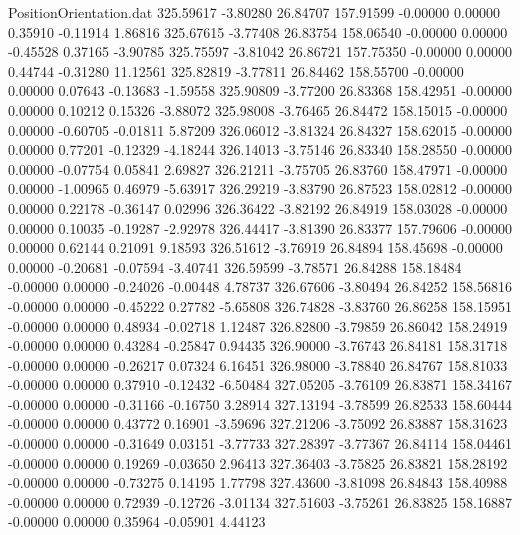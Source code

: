\begin{filecontents}{PositionOrientation.dat}
 325.59617   -3.80280   26.84707   157.91599   -0.00000    0.00000    0.35910   -0.11914    1.86816
 325.67615   -3.77408   26.83754   158.06540   -0.00000    0.00000   -0.45528    0.37165   -3.90785
 325.75597   -3.81042   26.86721   157.75350   -0.00000    0.00000    0.44744   -0.31280   11.12561
 325.82819   -3.77811   26.84462   158.55700   -0.00000    0.00000    0.07643   -0.13683   -1.59558
 325.90809   -3.77200   26.83368   158.42951   -0.00000    0.00000    0.10212    0.15326   -3.88072
 325.98008   -3.76465   26.84472   158.15015   -0.00000    0.00000   -0.60705   -0.01811    5.87209
 326.06012   -3.81324   26.84327   158.62015   -0.00000    0.00000    0.77201   -0.12329   -4.18244
 326.14013   -3.75146   26.83340   158.28550   -0.00000    0.00000   -0.07754    0.05841    2.69827
 326.21211   -3.75705   26.83760   158.47971   -0.00000    0.00000   -1.00965    0.46979   -5.63917
 326.29219   -3.83790   26.87523   158.02812   -0.00000    0.00000    0.22178   -0.36147    0.02996
 326.36422   -3.82192   26.84919   158.03028   -0.00000    0.00000    0.10035   -0.19287   -2.92978
 326.44417   -3.81390   26.83377   157.79606   -0.00000    0.00000    0.62144    0.21091    9.18593
 326.51612   -3.76919   26.84894   158.45698   -0.00000    0.00000   -0.20681   -0.07594   -3.40741
 326.59599   -3.78571   26.84288   158.18484   -0.00000    0.00000   -0.24026   -0.00448    4.78737
 326.67606   -3.80494   26.84252   158.56816   -0.00000    0.00000   -0.45222    0.27782   -5.65808
 326.74828   -3.83760   26.86258   158.15951   -0.00000    0.00000    0.48934   -0.02718    1.12487
 326.82800   -3.79859   26.86042   158.24919   -0.00000    0.00000    0.43284   -0.25847    0.94435
 326.90000   -3.76743   26.84181   158.31718   -0.00000    0.00000   -0.26217    0.07324    6.16451
 326.98000   -3.78840   26.84767   158.81033   -0.00000    0.00000    0.37910   -0.12432   -6.50484
 327.05205   -3.76109   26.83871   158.34167   -0.00000    0.00000   -0.31166   -0.16750    3.28914
 327.13194   -3.78599   26.82533   158.60444   -0.00000    0.00000    0.43772    0.16901   -3.59696
 327.21206   -3.75092   26.83887   158.31623   -0.00000    0.00000   -0.31649    0.03151   -3.77733
 327.28397   -3.77367   26.84114   158.04461   -0.00000    0.00000    0.19269   -0.03650    2.96413
 327.36403   -3.75825   26.83821   158.28192   -0.00000    0.00000   -0.73275    0.14195    1.77798
 327.43600   -3.81098   26.84843   158.40988   -0.00000    0.00000    0.72939   -0.12726   -3.01134
 327.51603   -3.75261   26.83825   158.16887   -0.00000    0.00000    0.35964   -0.05901    4.44123

\end{filecontents}
